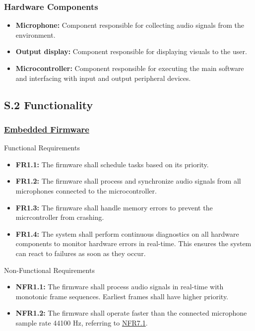\documentclass[12pt]{article}
\theoremstyle{definition}
\begin{document}
\subsubsection{Hardware Components}

\begin{itemize}
  \item \textbf{Microphone:}\label{comp:microphone} Component responsible for
  collecting audio signals from the environment.

  \item \textbf{Output display:}\label{comp:display} Component responsible for
  displaying visuals to the user.

  \item \textbf{Microcontroller:} \label{comp:microcontroller} Component
  responsible for executing the main software and interfacing with input and
  output peripheral devices.
\end{itemize}

\subsection{S.2 Functionality} \label{sec:S.2}

\subsubsection{\hyperref[comp:embedded_firmware]{Embedded Firmware}} Functional
Requirements
\begin{itemize}
  \item \label{FR1_1}\textbf{FR1.1:} The firmware shall schedule tasks based on
  its priority.
  
  \item \label{FR1_2}\textbf{FR1.2:} The firmware shall process and synchronize
  audio signals from all microphones connected to the microcontroller.

  \item \label{FR1_3}\textbf{FR1.3:} The firmware shall handle memory errors to
  prevent the micrcontroller from crashing.

  \item \label{FR1_4}\textbf{FR1.4:} The system shall perform continuous
  diagnostics on all hardware components to monitor hardware errors in
  real-time. This ensures the system can react to failures as soon as they
  occur.
\end{itemize}

Non-Functional Requirements
\begin{itemize}
  \item \label{NFR1_1}\textbf{NFR1.1:} The firmware shall process audio signals
  in real-time with monotonic frame sequences. Earliest frames shall have higher
  priority.
  
  \item \label{NFR1_2}\textbf{NFR1.2:} The firmware shall operate faster than
  the connected microphone sample rate 44100 Hz, referring to
  \hyperref[NFR7_1]{NFR7.1}.
\end{itemize}
\end{document}
